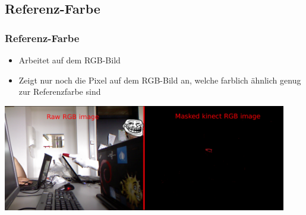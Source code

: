 \documentclass[compress]{beamer}
\begin{document}
\subsection{Referenz-Farbe}
\begin{frame}
\frametitle{Referenz-Farbe}
\begin{itemize}
	\item Arbeitet auf dem RGB-Bild
	\item Zeigt nur noch die Pixel auf dem RGB-Bild an, welche farblich ähnlich genug zur Referenzfarbe sind
\end{itemize}

\includegraphics[width=12.4cm]{filter4.png}
\end{frame}

%
%
\end{document}
